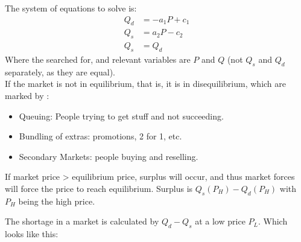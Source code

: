 \documentclass[nobib]{tufte-handout}
\begin{document}
The system of equations to solve is:
\begin{align*}
    Q_d & = -a_1P+c_1 \\
    Q_s & = a_2P-c_2  \\
    Q_s & =Q_d
\end{align*}
Where the searched for, and relevant variables are $P$ and $Q$ (not $Q_s$ and $Q_d$ separately, as they are equal).\\
If the market is not in equilibrium, that is, it is in disequilibrium, which are marked by :
\begin{itemize}
    \item Queuing: People trying to get stuff and not succeeding.
    \item Bundling of extras: promotions, 2 for 1, etc.
    \item Secondary Markets: people buying and reselling.
\end{itemize}
If market price > equilibrium price, surplus will occur, and thus market forces will force the price to reach equilibrium.
Surplus is $Q_s(P_H)-Q_d(P_H)$ with $P_H$ being the high price.
\begin{center}
\end{center}
The shortage in a market is calculated by $Q_d-Q_s$ at a low price $P_L$.
Which looks like this:
\end{document}
